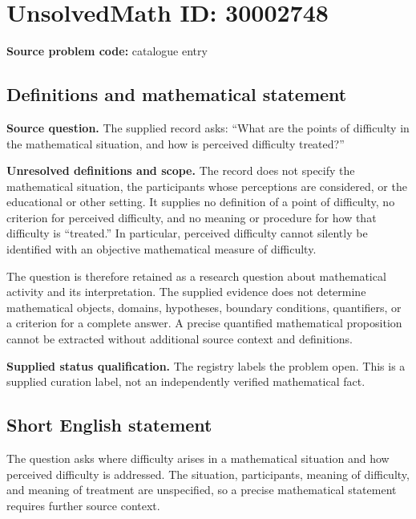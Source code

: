 \documentclass[11pt]{article}
\begin{document}
\section*{UnsolvedMath ID: 30002748}
\textbf{Source problem code:} catalogue entry
\subsection{Definitions and mathematical statement}
\textbf{Source question.} The supplied record asks: ``What are the points of difficulty in the mathematical situation, and how is perceived difficulty treated?''

\textbf{Unresolved definitions and scope.} The record does not specify the mathematical situation, the participants whose perceptions are considered, or the educational or other setting. It supplies no definition of a point of difficulty, no criterion for perceived difficulty, and no meaning or procedure for how that difficulty is ``treated.'' In particular, perceived difficulty cannot silently be identified with an objective mathematical measure of difficulty.

The question is therefore retained as a research question about mathematical activity and its interpretation. The supplied evidence does not determine mathematical objects, domains, hypotheses, boundary conditions, quantifiers, or a criterion for a complete answer. A precise quantified mathematical proposition cannot be extracted without additional source context and definitions.

\textbf{Supplied status qualification.} The registry labels the problem open. This is a supplied curation label, not an independently verified mathematical fact.
\subsection{Short English statement}
The question asks where difficulty arises in a mathematical situation and how perceived difficulty is addressed. The situation, participants, meaning of difficulty, and meaning of treatment are unspecified, so a precise mathematical statement requires further source context.
\end{document}
